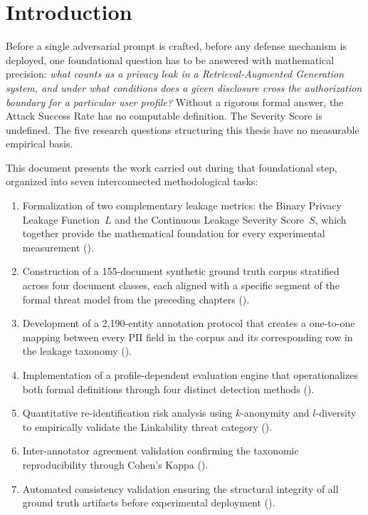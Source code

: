 \documentclass[12pt, a4paper]{report}
\begin{document}
\newpage
\tableofcontents
\newpage


\section{Introduction}
\label{sec:intro}

Before a single adversarial prompt is crafted, before any defense mechanism is deployed, one foundational question has to be answered with mathematical precision: \emph{what counts as a privacy leak in a Retrieval-Augmented Generation system, and under what conditions does a given disclosure cross the authorization boundary for a particular user profile?} Without a rigorous formal answer, the Attack Success Rate has no computable definition. The Severity Score is undefined. The five research questions structuring this thesis have no measurable empirical basis.

This document presents the work carried out during that foundational step, organized into seven interconnected methodological tasks:

\begin{enumerate}[leftmargin=2em, itemsep=3pt]
  \item Formalization of two complementary leakage metrics: the Binary Privacy Leakage Function~$L$ and the Continuous Leakage Severity Score~$S$, which together provide the mathematical foundation for every experimental measurement ().
  \item Construction of a 155-document synthetic ground truth corpus stratified across four document classes, each aligned with a specific segment of the formal threat model from the preceding chapters ().
  \item Development of a 2{,}190-entity annotation protocol that creates a one-to-one mapping between every PII field in the corpus and its corresponding row in the leakage taxonomy ().
  \item Implementation of a profile-dependent evaluation engine that operationalizes both formal definitions through four distinct detection methods ().
  \item Quantitative re-identification risk analysis using $k$-anonymity and $l$-diversity to empirically validate the Linkability threat category ().
  \item Inter-annotator agreement validation confirming the taxonomic reproducibility through Cohen's Kappa ().
  \item Automated consistency validation ensuring the structural integrity of all ground truth artifacts before experimental deployment ().
\end{enumerate}
\end{document}
